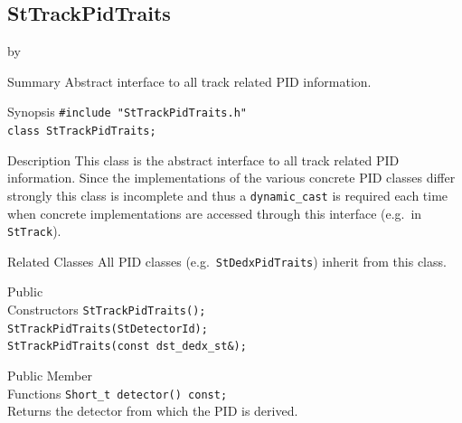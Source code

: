\documentclass[twoside]{article}
\newcommand{\entrylabel}[1]{\mbox{\textbf{{#1}}}\hfil}%
\newenvironment{entry}
{\begin{list}{}%
    {\renewcommand{\makelabel}{\entrylabel}%
     \setlength{\labelwidth}{90pt}%
     \setlength{\leftmargin}{\labelwidth}
     \advance\leftmargin by \labelsep%
      }%
    }%
  {\end{list}}
\newcommand{\Entrylabel}[1]%
{\raisebox{0pt}[1ex][0pt]{\makebox[\labelwidth][l]%
    {\parbox[t]{\labelwidth}{\hspace{0pt}\textbf{{#1}}}}}}
\newenvironment{Entry}%
{\renewcommand{\entrylabel}{\Entrylabel}\begin{entry}}%
  {\end{entry}}
\begin{document}
\subsection{StTrackPidTraits}
\label{sec:StTrackPidTraits}
\begin{Entry}
\item[Summary] Abstract interface to all track related PID information.
\item[Synopsis]
    \verb+#include "StTrackPidTraits.h"+\\
    \verb+class StTrackPidTraits;+\\

\item[Description]
    This class is the abstract interface to all track related PID
    information. Since the implementations of the various concrete PID
    classes differ strongly this class is incomplete and thus a
    \texttt{dynamic\_cast} is required each time when concrete
    implementations are accessed through this interface (e.g.~in
    \texttt{StTrack}).
    
\item[Related Classes] All PID classes (e.g.~\texttt{StDedxPidTraits})
    inherit from this class.
    
\item[Public\\ Constructors]
    \verb+StTrackPidTraits();+\\
    \verb+StTrackPidTraits(StDetectorId);+\\
    \verb+StTrackPidTraits(const dst_dedx_st&);+\\

\item[Public Member\\ Functions]
    \verb+Short_t detector() const;+\\
    Returns the detector from which the PID is derived.

\end{Entry}
\clearpage
\end{document}
